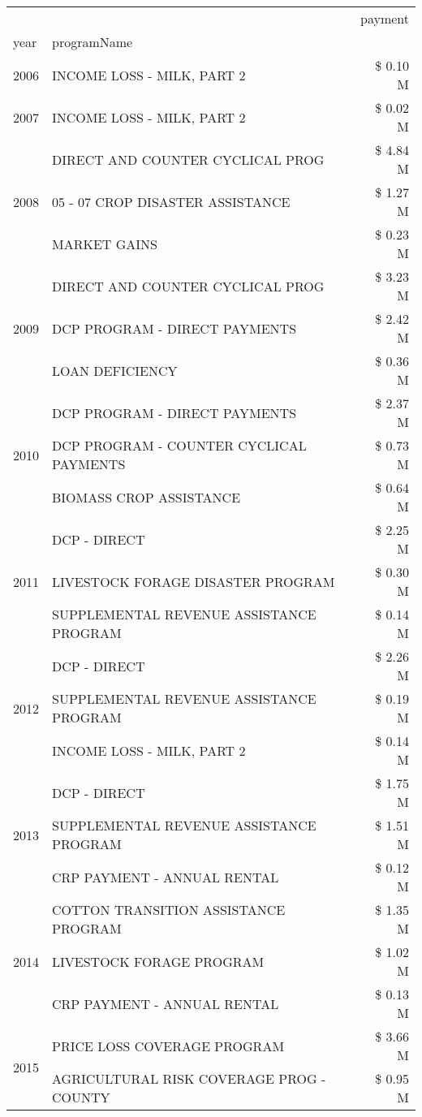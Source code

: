 \begin{tabular}{llr}
\toprule
 &  & payment \\
year & programName &  \\
\midrule
2006 & INCOME LOSS - MILK, PART 2 & \$ 0.10 M \\
\cline{1-3}
2007 & INCOME LOSS - MILK, PART 2 & \$ 0.02 M \\
\cline{1-3}
\multirow[t]{3}{*}{2008} & DIRECT AND COUNTER CYCLICAL PROG & \$ 4.84 M \\
 & 05 - 07 CROP DISASTER ASSISTANCE & \$ 1.27 M \\
 & MARKET GAINS & \$ 0.23 M \\
\cline{1-3}
\multirow[t]{3}{*}{2009} & DIRECT AND COUNTER CYCLICAL PROG & \$ 3.23 M \\
 & DCP PROGRAM - DIRECT PAYMENTS & \$ 2.42 M \\
 & LOAN DEFICIENCY & \$ 0.36 M \\
\cline{1-3}
\multirow[t]{3}{*}{2010} & DCP PROGRAM - DIRECT PAYMENTS & \$ 2.37 M \\
 & DCP PROGRAM - COUNTER CYCLICAL PAYMENTS & \$ 0.73 M \\
 & BIOMASS CROP ASSISTANCE & \$ 0.64 M \\
\cline{1-3}
\multirow[t]{3}{*}{2011} & DCP - DIRECT & \$ 2.25 M \\
 & LIVESTOCK FORAGE DISASTER PROGRAM & \$ 0.30 M \\
 & SUPPLEMENTAL REVENUE ASSISTANCE PROGRAM & \$ 0.14 M \\
\cline{1-3}
\multirow[t]{3}{*}{2012} & DCP - DIRECT & \$ 2.26 M \\
 & SUPPLEMENTAL REVENUE ASSISTANCE PROGRAM & \$ 0.19 M \\
 & INCOME LOSS - MILK, PART 2 & \$ 0.14 M \\
\cline{1-3}
\multirow[t]{3}{*}{2013} & DCP - DIRECT & \$ 1.75 M \\
 & SUPPLEMENTAL REVENUE ASSISTANCE PROGRAM & \$ 1.51 M \\
 & CRP PAYMENT - ANNUAL RENTAL & \$ 0.12 M \\
\cline{1-3}
\multirow[t]{3}{*}{2014} & COTTON TRANSITION ASSISTANCE PROGRAM & \$ 1.35 M \\
 & LIVESTOCK FORAGE PROGRAM & \$ 1.02 M \\
 & CRP PAYMENT - ANNUAL RENTAL & \$ 0.13 M \\
\cline{1-3}
\multirow[t]{3}{*}{2015} & PRICE LOSS COVERAGE PROGRAM & \$ 3.66 M \\
 & AGRICULTURAL RISK COVERAGE PROG - COUNTY & \$ 0.95 M \\

\end{tabular}
